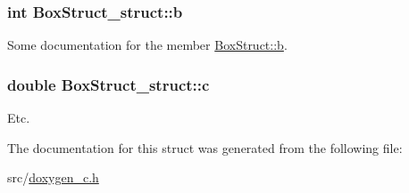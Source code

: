 \subsubsection[{b}]{\setlength{\rightskip}{0pt plus 5cm}int Box\+Struct\+\_\+struct\+::b}\label{struct_box_struct__struct_aee44748dc579c5d794853ee8b133d197}
Some documentation for the member \hyperlink{struct_box_struct__struct_aee44748dc579c5d794853ee8b133d197}{Box\+Struct\+::b}. \hypertarget{struct_box_struct__struct_a4543370ed67b2cf5ae3f55201bea11e6}{}
\subsubsection[{c}]{\setlength{\rightskip}{0pt plus 5cm}double Box\+Struct\+\_\+struct\+::c}\label{struct_box_struct__struct_a4543370ed67b2cf5ae3f55201bea11e6}
Etc. 

The documentation for this struct was generated from the following file\+:\begin{DoxyCompactItemize}
\item 
src/\hyperlink{doxygen__c_8h}{doxygen\+\_\+c.\+h}\end{DoxyCompactItemize}
